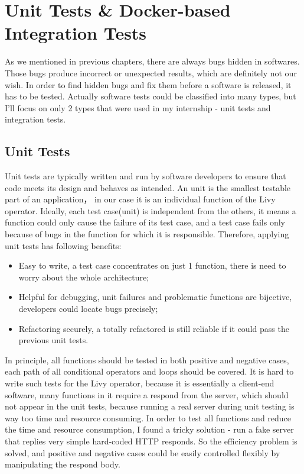 \documentclass[article,colorback,accentcolor=tud4c]{tudreport}
\begin{document}
\newpage

\section{Unit Tests \& Docker-based Integration Tests}
\setcounter{table}{0}
\setcounter{figure}{0}

As we mentioned in previous chapters, there are always bugs hidden in softwares. Those bugs produce incorrect or unexpected results, which are definitely not our wish. In order to find hidden bugs and fix them before a software is released, it has to be tested. Actually software tests could be classified into many types, but I'll focus on only 2 types that were used in my internship - unit tests and integration tests.

	\subsection{Unit Tests}
	Unit tests are typically written and run by software developers to ensure that code meets its design and behaves as intended. An unit is the smallest testable part of an application， in our case it is an individual function of the Livy operator. Ideally, each test case(unit) is independent from the others, it means a function could only cause the failure of its test case, and a test case fails only because of bugs in the function for which it is responsible. Therefore, applying unit tests has following benefits:
	
	\begin{itemize}
		\item Easy to write, a test case concentrates on just 1 function, there is need to worry about the whole architecture;
		\item Helpful for debugging, unit failures and problematic functions are bijective, developers could locate bugs precisely;
		\item Refactoring securely, a totally refactored is still reliable if it could pass the previous unit tests.
	\end{itemize}
	
	In principle, all functions should be tested in both positive and negative cases, each path of all conditional operators and loops should be covered. It is hard to write such tests for the Livy operator, because it is essentially a client-end software, many functions in it require a respond from the server, which should not appear in the unit tests, because running a real server during unit testing is way too time and resource consuming. In order to test all functions and reduce the time and resource consumption, I found a tricky solution - run a fake server that replies very simple hard-coded HTTP responds. So the efficiency problem is solved, and positive and negative cases could be easily controlled flexibly by manipulating the respond body.
		
\end{document}
